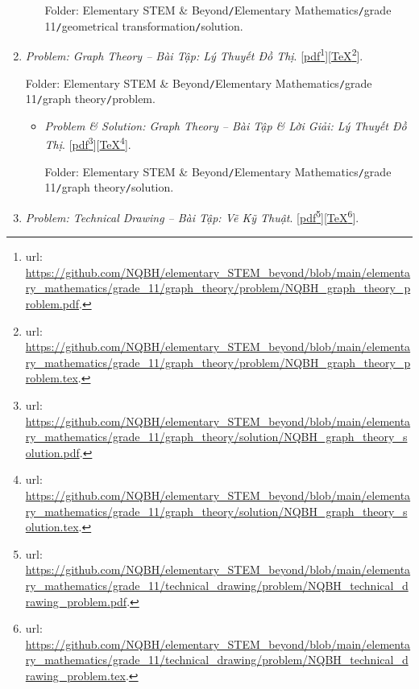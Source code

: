 \documentclass[12pt,twoside]{book}
\begin{document}
\begin{enumerate}
\begin{itemize}
		Folder: {\sf Elementary STEM \& Beyond{\tt/}Elementary Mathematics{\tt/}grade 11{\tt/}geometrical transformation{\tt/}solution}.
	\end{itemize}
	\item {\it Problem: Graph Theory -- Bài Tập: Lý Thuyết Đồ Thị}. [\href{https://github.com/NQBH/elementary_STEM_beyond/blob/main/elementary_mathematics/grade_11/graph_theory/problem/NQBH_graph_theory_problem.pdf}{pdf}\footnote{{\sc url}: \url{https://github.com/NQBH/elementary_STEM_beyond/blob/main/elementary_mathematics/grade_11/graph_theory/problem/NQBH_graph_theory_problem.pdf}.}][\href{https://github.com/NQBH/elementary_STEM_beyond/blob/main/elementary_mathematics/grade_11/graph_theory/problem/NQBH_graph_theory_problem.tex}{\TeX}\footnote{{\sc url}: \url{https://github.com/NQBH/elementary_STEM_beyond/blob/main/elementary_mathematics/grade_11/graph_theory/problem/NQBH_graph_theory_problem.tex}.}].
	
	Folder: {\sf Elementary STEM \& Beyond{\tt/}Elementary Mathematics{\tt/}grade 11{\tt/}graph theory{\tt/}problem}.
	\begin{itemize}
		\item {\it Problem \& Solution: Graph Theory -- Bài Tập \& Lời Giải: Lý Thuyết Đồ Thị}. [\href{https://github.com/NQBH/elementary_STEM_beyond/blob/main/elementary_mathematics/grade_11/graph_theory/solution/NQBH_graph_theory_solution.pdf}{pdf}\footnote{{\sc url}: \url{https://github.com/NQBH/elementary_STEM_beyond/blob/main/elementary_mathematics/grade_11/graph_theory/solution/NQBH_graph_theory_solution.pdf}.}][\href{https://github.com/NQBH/elementary_STEM_beyond/blob/main/elementary_mathematics/grade_11/graph_theory/solution/NQBH_graph_theory_solution.tex}{\TeX}\footnote{{\sc url}: \url{https://github.com/NQBH/elementary_STEM_beyond/blob/main/elementary_mathematics/grade_11/graph_theory/solution/NQBH_graph_theory_solution.tex}.}].
		
		Folder: {\sf Elementary STEM \& Beyond{\tt/}Elementary Mathematics{\tt/}grade 11{\tt/}graph theory{\tt/}solution}.
	\end{itemize}
	\item {\it Problem: Technical Drawing -- Bài Tập: Vẽ Kỹ Thuật}. [\href{https://github.com/NQBH/elementary_STEM_beyond/blob/main/elementary_mathematics/grade_11/technical_drawing/problem/NQBH_technical_drawing_problem.pdf}{pdf}\footnote{{\sc url}: \url{https://github.com/NQBH/elementary_STEM_beyond/blob/main/elementary_mathematics/grade_11/technical_drawing/problem/NQBH_technical_drawing_problem.pdf}.}][\href{https://github.com/NQBH/elementary_STEM_beyond/blob/main/elementary_mathematics/grade_11/technical_drawing/problem/NQBH_technical_drawing_problem.tex}{\TeX}\footnote{{\sc url}: \url{https://github.com/NQBH/elementary_STEM_beyond/blob/main/elementary_mathematics/grade_11/technical_drawing/problem/NQBH_technical_drawing_problem.tex}.}].
	

\end{enumerate}
\end{document}
